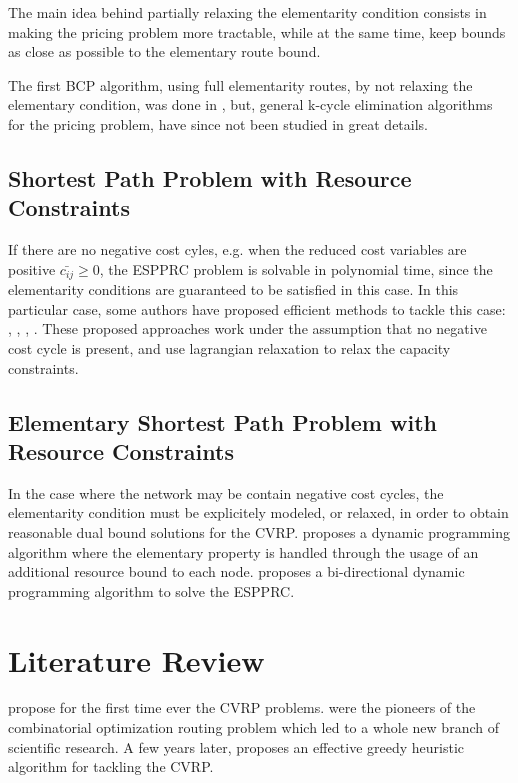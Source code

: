 The main idea behind partially relaxing the elementarity condition consists
in making the pricing problem more tractable, while at the same time,
keep bounds as close as possible to the elementary route bound.


The first BCP algorithm, using full elementarity routes, by not relaxing the elementary
condition, was done in \cite{chabrier2006},
but, general k-cycle elimination algorithms for the pricing problem, have since not been studied
in great details.

\subsection{Shortest Path Problem with Resource Constraints}
If there are no negative cost cyles, e.g. when the reduced cost variables are positive $\bar{c_{ij}} \ge 0$,
the ESPPRC problem is solvable in polynomial time, since the elementarity conditions are guaranteed
to be satisfied in this case.
In this particular case, some authors have proposed efficient methods to tackle this case:
\cite{beasley1989}, \cite{carlyle2008}, \cite{dumitrescu2003}, \cite{muhandiramge2009}.
These proposed approaches work under the assumption that no negative cost cycle is present,
and use lagrangian relaxation to relax the capacity constraints.


\subsection{Elementary Shortest Path Problem with Resource Constraints}
In the case where the network may be contain negative cost cycles, the
elementarity condition must be explicitely modeled, or relaxed, in order
to obtain reasonable dual bound solutions for the CVRP.
\textcite{feillet2004} proposes a dynamic programming algorithm where
the elementary property is handled through the usage of an additional resource
bound to each node.
\textcite{righini2006} proposes a bi-directional dynamic programming algorithm to solve the ESPPRC.


\section{Literature Review}
\label{sec:intro-literature-review}



\textcite{dantzig1959} propose for the first time ever
the CVRP problems.
\citeauthor{dantzig1959} were the pioneers of the
combinatorial optimization routing problem
which led to a whole new branch of scientific research.
A few years later, \textcite{clarke1964} proposes
an effective greedy heuristic algorithm for tackling the CVRP.

